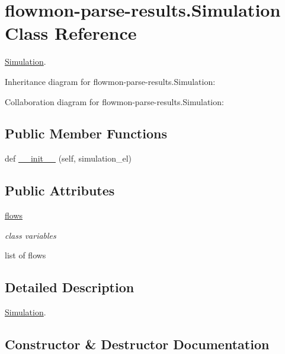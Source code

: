 \hypertarget{classflowmon-parse-results_1_1Simulation}{}\section{flowmon-\/parse-\/results.Simulation Class Reference}
\label{classflowmon-parse-results_1_1Simulation}


\hyperlink{classflowmon-parse-results_1_1Simulation}{Simulation}.  




Inheritance diagram for flowmon-\/parse-\/results.Simulation\+:


Collaboration diagram for flowmon-\/parse-\/results.Simulation\+:
\subsection*{Public Member Functions}
\begin{DoxyCompactItemize}
\item 
def \hyperlink{classflowmon-parse-results_1_1Simulation_a3ad9056ca72eaed413fcfd6950541a3c}{\+\_\+\+\_\+init\+\_\+\+\_\+} (self, simulation\+\_\+el)
\end{DoxyCompactItemize}
\subsection*{Public Attributes}
\begin{DoxyCompactItemize}
\item 
\hyperlink{classflowmon-parse-results_1_1Simulation_a284732729c5e18035724c5565ebd75b7}{flows}
\begin{DoxyCompactList}\small\item\em class variables

list of flows \end{DoxyCompactList}\end{DoxyCompactItemize}


\subsection{Detailed Description}
\hyperlink{classflowmon-parse-results_1_1Simulation}{Simulation}. 

\subsection{Constructor \& Destructor Documentation}
